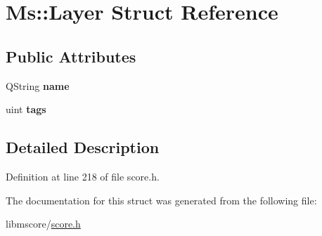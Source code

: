 \hypertarget{struct_ms_1_1_layer}{}\section{Ms\+:\+:Layer Struct Reference}
\label{struct_ms_1_1_layer}
\subsection*{Public Attributes}
\begin{DoxyCompactItemize}
\item 
\mbox{\label{struct_ms_1_1_layer_ad73ce8603a7327e5693f099db27e89ec}} 
Q\+String {\bfseries name}
\item 
\mbox{\label{struct_ms_1_1_layer_af01184b51a9020d58c5b3b285d36023c}} 
uint {\bfseries tags}
\end{DoxyCompactItemize}


\subsection{Detailed Description}


Definition at line 218 of file score.\+h.



The documentation for this struct was generated from the following file\+:\begin{DoxyCompactItemize}
\item 
libmscore/\hyperlink{score_8h}{score.\+h}\end{DoxyCompactItemize}
